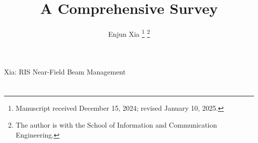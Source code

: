 \documentclass[journal]{IEEEtran}
\begin{document}
\title{\\A Comprehensive Survey}

\author{Enjun Xia
\thanks{Manuscript received December 15, 2024; revised January 10, 2025.}
\thanks{The author is with the School of Information and Communication Engineering.}
}

%
{Xia: RIS Near-Field Beam Management}

\maketitle

\begin{abstract}

\end{abstract}

\begin{IEEEkeywords}

\end{IEEEkeywords}

\section{}




\end{document}
